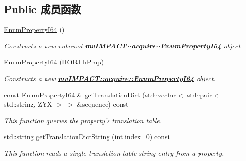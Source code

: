 \subsection*{Public 成员函数}
\begin{DoxyCompactItemize}
\item 
\hypertarget{classmv_i_m_p_a_c_t_1_1acquire_1_1_enum_property_i64_aacc5d7ab733702cd387bc4100c15aa6e}{\hyperlink{classmv_i_m_p_a_c_t_1_1acquire_1_1_enum_property_i64_aacc5d7ab733702cd387bc4100c15aa6e}{Enum\+Property\+I64} ()}\label{classmv_i_m_p_a_c_t_1_1acquire_1_1_enum_property_i64_aacc5d7ab733702cd387bc4100c15aa6e}

\begin{DoxyCompactList}\small\item\em Constructs a new unbound {\bfseries \hyperlink{classmv_i_m_p_a_c_t_1_1acquire_1_1_enum_property_i64}{mv\+I\+M\+P\+A\+C\+T\+::acquire\+::\+Enum\+Property\+I64}} object. \end{DoxyCompactList}\item 
\hyperlink{classmv_i_m_p_a_c_t_1_1acquire_1_1_enum_property_i64_a79a49681504a169f6f9b025f2e5acc39}{Enum\+Property\+I64} (H\+O\+B\+J h\+Prop)
\begin{DoxyCompactList}\small\item\em Constructs a new {\bfseries \hyperlink{classmv_i_m_p_a_c_t_1_1acquire_1_1_enum_property_i64}{mv\+I\+M\+P\+A\+C\+T\+::acquire\+::\+Enum\+Property\+I64}} object. \end{DoxyCompactList}\item 
const \hyperlink{classmv_i_m_p_a_c_t_1_1acquire_1_1_enum_property_i64}{Enum\+Property\+I64} \& \hyperlink{classmv_i_m_p_a_c_t_1_1acquire_1_1_enum_property_i64_a44a7cd1ee2000d169e39f4e5b130a410}{get\+Translation\+Dict} (std\+::vector$<$ std\+::pair$<$ std\+::string, Z\+Y\+X $>$ $>$ \&sequence) const 
\begin{DoxyCompactList}\small\item\em This function queries the property's translation table. \end{DoxyCompactList}\item 
std\+::string \hyperlink{classmv_i_m_p_a_c_t_1_1acquire_1_1_enum_property_i64_a35ab8729450542dd746ee7b9c1185555}{get\+Translation\+Dict\+String} (int index=0) const 
\begin{DoxyCompactList}\small\item\em This function reads a single translation table string entry from a property. \end{DoxyCompactList}\item 

\end{DoxyCompactItemize}
